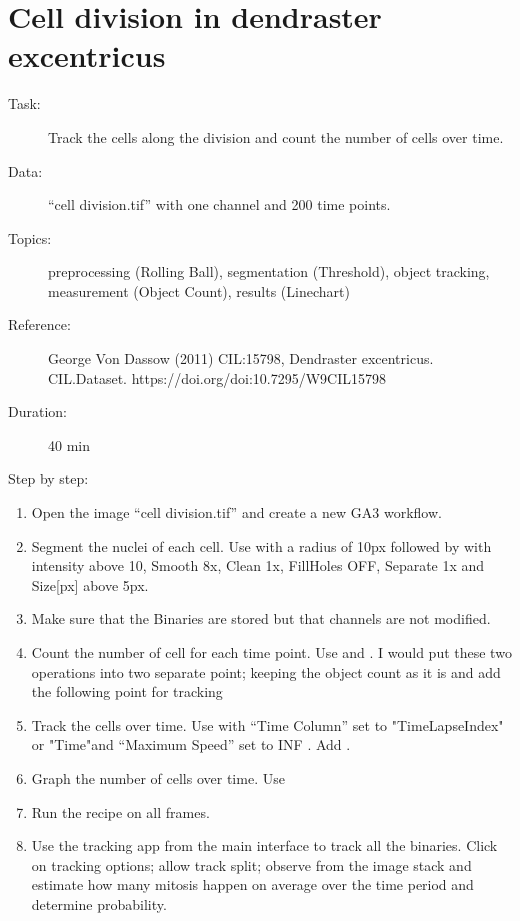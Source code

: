 \section{Cell division in dendraster excentricus}

\begin{description}
    \item[Task:] Track the cells along the division and count the number of cells over time.
    \item[Data:] ``cell division.tif'' with one channel and 200 time points.
    \item[Topics:] preprocessing (Rolling Ball), segmentation (Threshold), object tracking, measurement (Object Count), results (Linechart)
    \item[Reference:] 
        George Von Dassow (2011) CIL:15798, Dendraster excentricus. \\
        CIL.Dataset. https://doi.org/doi:10.7295/W9CIL15798
    \item[Duration:] 40 min
    \item[Step by step:]
\end{description}

\begin{enumerate}
    \item Open the image ``cell division.tif'' and create a new GA3 workflow.
    \item Segment the nuclei of each cell. \soln Use  with a radius of 10px followed by  with intensity above 10, Smooth 8x, Clean 1x, FillHoles OFF, Separate 1x and Size[px] above 5px. \solnend
    \item Make sure that the Binaries are stored but that channels are not modified.
    \item Count the number of cell for each time point. Use  and .
    I would put these two operations into two separate point; keeping the object count as it is and add the following point for tracking
    \item Track the cells over time. Use  with ``Time Column'' set to "TimeLapseIndex" or "Time"\soln and ``Maximum Speed'' set to INF \solnend. Add .
    \item Graph the number of cells over time. Use 
    \item Run the recipe on all frames. 
    \item Use the tracking app from the main interface to track all the binaries.
    Click on tracking options; allow track split; observe from the image stack and estimate how many mitosis happen on average over the time period and determine probability.
\end{enumerate}
